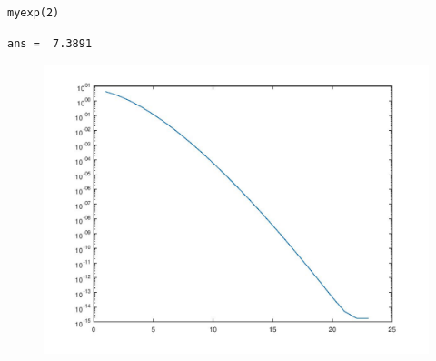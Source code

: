 \documentclass[10pt]{article}
\begin{document}
\begin{lstlisting}
myexp(2)
\end{lstlisting}
\begin{lstlisting}[language={},xleftmargin=5pt,frame=none]
ans =  7.3891

\end{lstlisting}
\begin{figure}[!ht]
\includegraphics[width=\textwidth]{myscript-2.jpg}
\end{figure}
\end{document}
